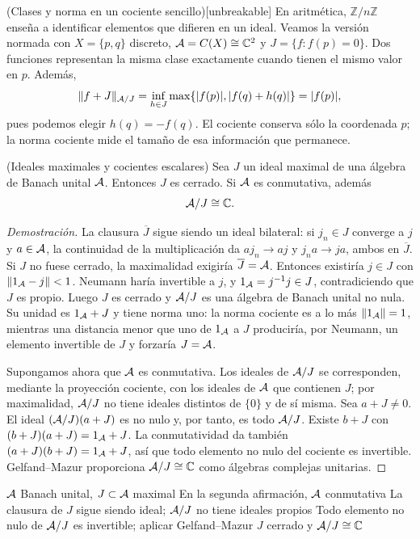 \begin{cthejemplo}{(Clases y norma en un cociente sencillo)}[unbreakable]
En aritmética, $\mathbb Z/n\mathbb Z$ enseña a identificar elementos
que difieren en un ideal. Veamos la versión normada con
$X=\{p,q\}$ discreto, $\mathcal A=C(X)\cong\mathbb C^2$ y
$J=\{f:f(p)=0\}$. Dos funciones representan la misma clase
exactamente cuando tienen el mismo valor en $p$. Además,
\[
 \|f+J\|_{\mathcal A/J}
 =\inf_{h\in J}\max\{|f(p)|,|f(q)+h(q)|\}
 =|f(p)|,
\]
pues podemos elegir $h(q)=-f(q)$. El cociente conserva sólo la
coordenada $p$; la norma cociente mide el tamaño de esa información
que permanece.
\end{cthejemplo}

\begin{cthproposicion}{(Ideales maximales y cocientes escalares)}
Sea $J$ un ideal maximal de una álgebra de Banach unital $\mathcal A$.
Entonces $J$ es cerrado. Si $\mathcal A$ es conmutativa, además
\[
 \mathcal A/J\cong\mathbb C.
\]
\end{cthproposicion}

\begin{proof}[Demostración]
La clausura $\overline J$ sigue siendo un ideal bilateral: si
$j_n\in J$ converge a $j$ y $a\in\mathcal A$, la continuidad de la
multiplicación da $aj_n\to aj$ y $j_na\to ja$, ambos en
$\overline J$. Si $J$ no fuese cerrado, la maximalidad exigiría
$\overline J=\mathcal A$. Entonces existiría $j\in J$ con
$\|1_\mathcal A-j\|<1$. Neumann haría invertible a $j$, y
$1_\mathcal A=j^{-1}j\in J$, contradiciendo que $J$ es propio.
Luego $J$ es cerrado y $\mathcal A/J$ es una álgebra de Banach unital no nula.
Su unidad es $1_\mathcal A+J$ y tiene norma uno: la norma cociente es a lo más
$\|1_\mathcal A\|=1$, mientras una distancia menor que uno de $1_\mathcal A$ a $J$
produciría, por Neumann, un elemento invertible de $J$ y forzaría
$J=\mathcal A$.

Supongamos ahora que $\mathcal A$ es conmutativa. Los ideales de $\mathcal A/J$
se corresponden, mediante la proyección cociente, con los ideales
de $\mathcal A$ que contienen $J$; por maximalidad, $\mathcal A/J$ no tiene
ideales distintos de $\{0\}$ y de sí misma. Sea $a+J\ne0$.
El ideal $(\mathcal A/J)(a+J)$ es no nulo y, por tanto, es todo $\mathcal A/J$.
Existe $b+J$ con $(b+J)(a+J)=1_\mathcal A+J$. La conmutatividad da
también $(a+J)(b+J)=1_\mathcal A+J$, así que todo elemento no nulo
del cociente es invertible. Gelfand--Mazur proporciona
$\mathcal A/J\cong\mathbb C$ como álgebras complejas unitarias.
\end{proof}

\proofdiagrambranch
{$\mathcal A$ Banach unital, $J\subset\mathcal A$ maximal}
{En la segunda afirmación, $\mathcal A$ conmutativa}
{La clausura de $J$ sigue siendo ideal; $\mathcal A/J$ no tiene ideales propios}
{Todo elemento no nulo de $\mathcal A/J$ es invertible; aplicar Gelfand--Mazur}
{$J$ cerrado y $\mathcal A/J\cong\mathbb C$}

